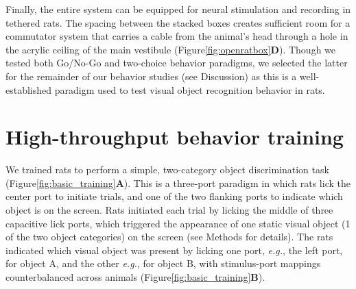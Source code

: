 Finally, the entire system can be equipped for neural stimulation and recording in tethered rats. The spacing between the stacked boxes creates sufficient room for a commutator system that carries a cable from the animal's head through a hole in the acrylic ceiling of the main vestibule (Figure\ref{fig:openratbox}\textbf{D}). Though we tested both Go/No-Go and two-choice behavior paradigms, we selected the latter for the remainder of our behavior studies (see Discussion) as this is a well-established paradigm used to test visual object recognition behavior in rats\cite{Lashley1930, Zoccolan2009, Prusky2000, REFREF}. 

\section{High-throughput behavior training}
We trained rats to perform a simple, two-category object discrimination task\cite{Zoccolan2009} (Figure\ref{fig:basic_training}\textbf{A}). This is a three-port paradigm in which rats lick the center port to initiate trials, and one of the two flanking ports to indicate which object is on the screen. Rats initiated each trial by licking the middle of three capacitive lick ports, which triggered the appearance of one static visual object (1 of the two object categories) on the screen (see Methods for details). The rats indicated which visual object was present by licking one port, \textit{e.g.}, the left port, for object A, and the other \textit{e.g.}, for object B, with stimulus-port mappings counterbalanced across animals (Figure\ref{fig:basic_training}\textbf{B}).

